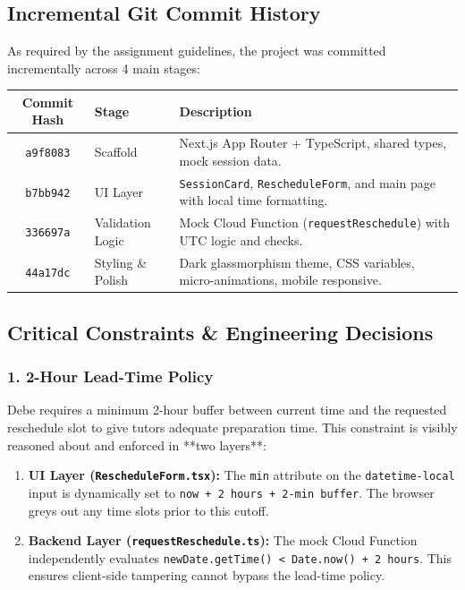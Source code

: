 \documentclass[11pt, a4paper]{article}
\begin{document}
\subsection{Incremental Git Commit History}

As required by the assignment guidelines, the project was committed incrementally across 4 main stages:

\begin{table}[h!]
\centering
\begin{tabular}{@{}c p{3cm} p{10cm}@{}}
\toprule
\textbf{Commit Hash} & \textbf{Stage} & \textbf{Description} \\
\midrule
\texttt{a9f8083} & Scaffold & Next.js App Router + TypeScript, shared types, mock session data. \\
\texttt{b7bb942} & UI Layer & \texttt{SessionCard}, \texttt{RescheduleForm}, and main page with local time formatting. \\
\texttt{336697a} & Validation Logic & Mock Cloud Function (\texttt{requestReschedule}) with UTC logic and checks. \\
\texttt{44a17dc} & Styling \& Polish & Dark glassmorphism theme, CSS variables, micro-animations, mobile responsive. \\
\bottomrule
\end{tabular}
\end{table}

\subsection{Critical Constraints \& Engineering Decisions}

\subsubsection{1. 2-Hour Lead-Time Policy}
Debe requires a minimum 2-hour buffer between current time and the requested reschedule slot to give tutors adequate preparation time. This constraint is visibly reasoned about and enforced in **two layers**:

\begin{enumerate}
  \item \textbf{UI Layer (\texttt{RescheduleForm.tsx}):} The \texttt{min} attribute on the \texttt{datetime-local} input is dynamically set to \texttt{now + 2 hours + 2-min buffer}. The browser greys out any time slots prior to this cutoff.
  \item \textbf{Backend Layer (\texttt{requestReschedule.ts}):} The mock Cloud Function independently evaluates \texttt{newDate.getTime() < Date.now() + 2 hours}. This ensures client-side tampering cannot bypass the lead-time policy.
\end{enumerate}
\end{document}
